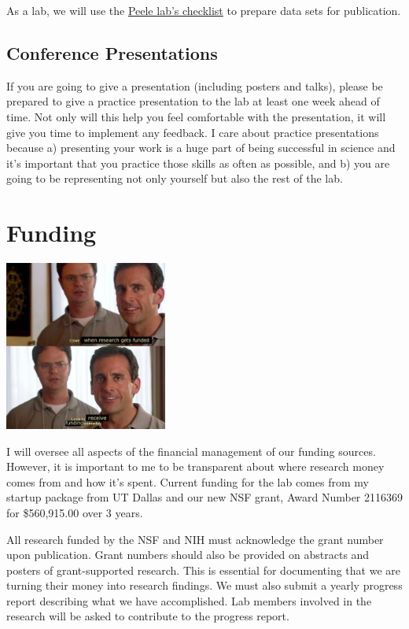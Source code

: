 \documentclass[
]{book}
\begin{document}
As a lab, we will use the \href{https://github.com/jpeelle/paperchecklist/blob/master/checklist.pdf}{Peele lab's checklist} to prepare data sets for publication.

\hypertarget{conference-presentations}{%
\subsection{Conference Presentations}\label{conference-presentations}}

If you are going to give a presentation (including posters and talks), please be prepared to give a practice presentation to the lab at least one week ahead of time. Not only will this help you feel comfortable with the presentation, it will give you time to implement any feedback. I care about practice presentations because a) presenting your work is a huge part of being successful in science and it's important that you practice those skills as often as possible, and b) you are going to be representing not only yourself but also the rest of the lab.

\hypertarget{funding}{%
\section{Funding}\label{funding}}

\includegraphics[width=0.4\textwidth,height=\textheight]{images/inside_joke_funding.jpg}

I will oversee all aspects of the financial management of our funding sources. However, it is important to me to be transparent about where research money comes from and how it's spent. Current funding for the lab comes from my startup package from UT Dallas and our new NSF grant, Award Number 2116369 for \$560,915.00 over 3 years.

All research funded by the NSF and NIH must acknowledge the grant number upon publication. Grant numbers should also be provided on abstracts and posters of grant-supported research. This is essential for documenting that we are turning their money into research findings. We must also submit a yearly progress report describing what we have accomplished. Lab members involved in the research will be asked to contribute to the progress report.
\end{document}
